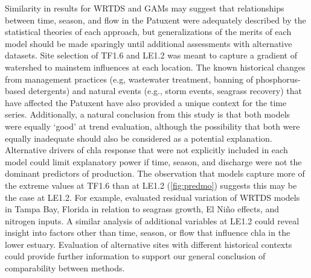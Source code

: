 \documentclass[letterpaper,12pt,oneside]{article}\usepackage[]{graphicx}\usepackage[]{color}
\begin{document}
Similarity in results for \ac{WRTDS} and \acp{GAM} may suggest that relationships between time, season, and flow in the Patuxent were adequately described by the statistical theories of each approach, but generalizations of the merits of each model should be made sparingly until additional assessments with alternative datasets.  Site selection of TF1.6 and LE1.2 was meant to capture a gradient of watershed to mainstem influences at each location.  The known historical changes from management practices (e.g, wastewater treatment, banning of phosphorus-based detergents) and natural events (e.g., storm events, seagrass recovery) that have affected the Patuxent have also provided a unique context for the time series.  Additionally, a natural conclusion from this study is that both models were equally `good' at trend evaluation, although the possibility that both were equally inadequate should also be considered as a potential explanation.  Alternative drivers of \ac{chla} response that were not explicitly included in each model could limit explanatory power if time, season, and discharge were not the dominant predictors of production. The observation that models capture more of the extreme values at TF1.6 than at LE1.2 (\cref{fig:predmo}) suggests this may be the case at LE1.2.  For example, \citet{Beck15} evaluated residual variation of \ac{WRTDS} models in Tampa Bay, Florida in relation to seagrass growth, El Ni\~no effects, and nitrogen inputs.  A similar analysis of additional variables at LE1.2 could reveal insight into factors other than time, season, or flow that influence \ac{chla} in the lower estuary. Evaluation of alternative sites with different historical contexts could provide further information to support our general conclusion of comparability between methods.    
\end{document}
